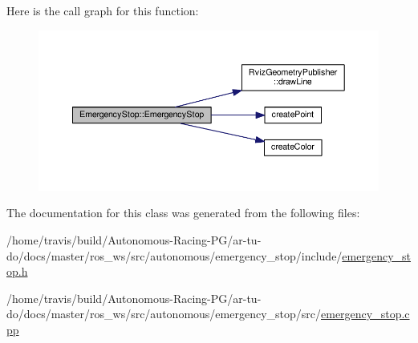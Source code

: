 Here is the call graph for this function\+:
\nopagebreak
\begin{figure}[H]
\begin{center}
\leavevmode
\includegraphics[width=350pt]{class_emergency_stop_acd5c3e0c838fe697ebf95452199cca77_cgraph}
\end{center}
\end{figure}




The documentation for this class was generated from the following files\+:\begin{DoxyCompactItemize}
\item 
/home/travis/build/\+Autonomous-\/\+Racing-\/\+P\+G/ar-\/tu-\/do/docs/master/ros\+\_\+ws/src/autonomous/emergency\+\_\+stop/include/\hyperlink{emergency__stop_8h}{emergency\+\_\+stop.\+h}\item 
/home/travis/build/\+Autonomous-\/\+Racing-\/\+P\+G/ar-\/tu-\/do/docs/master/ros\+\_\+ws/src/autonomous/emergency\+\_\+stop/src/\hyperlink{emergency__stop_8cpp}{emergency\+\_\+stop.\+cpp}\end{DoxyCompactItemize}
